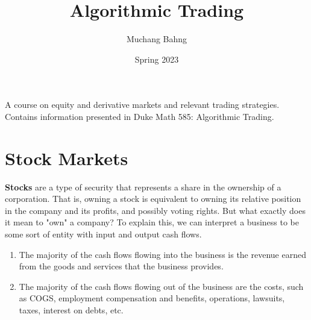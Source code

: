 \documentclass{article}
\begin{document}
\title{Algorithmic Trading}
\author{Muchang Bahng}
\date{Spring 2023}

\maketitle
\tableofcontents
\pagebreak

A course on equity and derivative markets and relevant trading strategies. Contains information presented in Duke Math 585: Algorithmic Trading. 

\section{Stock Markets}

  \textbf{Stocks} are a type of security that represents a share in the ownership of a corporation. That is, owning a stock is equivalent to owning its relative position in the company and its profits, and possibly voting rights. But what exactly does it mean to "own" a company? To explain this, we can interpret a business to be some sort of entity with input and output cash flows.

  \begin{enumerate}
      \item The majority of the cash flows flowing into the business is the revenue earned from the goods and services that the business provides. 
      \item The majority of the cash flows flowing out of the business are the costs, such as COGS, employment compensation and benefits, operations, lawsuits, taxes, interest on debts, etc.
  \end{enumerate}
\end{document}
